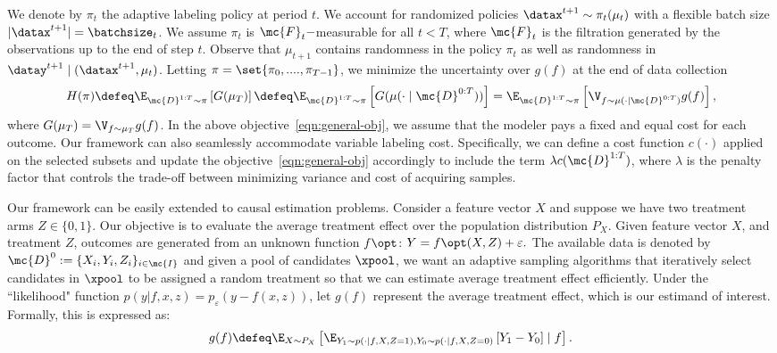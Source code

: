  We denote by $\pi_t$ the adaptive labeling policy at period $t$. We account for randomized policies $\datax^{t+1} \sim \pi_t(\mu_t)$ with a flexible batch size $|\datax^{t+1}| = \batchsize_t$.   
We assume $\pi_t$ is $\mc{F}_t-$measurable for all $t < T$, where $\mc{F}_t$ is the filtration generated by the observations up to the end of step $t$.
 Observe that $\mu_{t+1}$ contains randomness in the policy $\pi_t$ as well as randomness in $\datay^{t+1} \mid (\datax^{t+1},\mu_t)$. Letting $\pi = \set{\pi_0,....,\pi_{T-1}}$,  we minimize the uncertainty over $g(f)$
 at the end of data collection
\begin{align}
H(\pi) \defeq \E_{\mc{D}^{1:T} \sim \pi} \left[G(\mu_{T}) \right]  \defeq  \E_{\mc{D}^{1:T} \sim \pi} \left[G(\mu(\cdot \mid \mc{D}^{0:T})) \right]
     = \E_{\mc{D}^{1:T} \sim \pi} \left[ \V_{f \sim \mu(\cdot \mid \mc{D}^{0:T})}  g(f)  \right],
     \label{eqn:general-obj}
\end{align}   
where $G(\mu_T) = \V_{f \sim \mu_T}  g(f)$.
In the above objective~\eqref{eqn:general-obj}, we assume
that the modeler pays a fixed and equal cost for each outcome. 
Our framework can also seamlessly accommodate variable labeling cost. Specifically, we can define a cost function $c(\cdot)$ 
 applied on the selected subsets 
 and update the objective~\eqref{eqn:general-obj} accordingly to include the term  $\lambda c(\mc{D}^{1:T})$,
 where $\lambda$
 is the penalty factor that controls the trade-off between minimizing variance and cost of acquiring samples.


Our framework can be easily extended to causal estimation problems.  Consider a feature vector ${X}$ and suppose we have two treatment arms $Z \in \{0,1\}$. Our objective is to evaluate the average treatment effect over the population distribution $P_X$.  Given feature vector $X$, and treatment $Z$,  outcomes are generated from an unknown function $f\opt$: 
$Y = f\opt(X,Z) + \varepsilon.$
The available data is denoted by $\mc{D}^0 := \{X_i,Y_i,Z_i\}_{i \in \mc{I}}$ and given a pool of candidates 
$\xpool$, we want an
 adaptive sampling algorithms that iteratively select
candidates in $\xpool$ to be assigned a random treatment so that we can estimate average treatment effect efficiently. Under the ``likelihood" function $p(y | f, x, z) = p_{\varepsilon}(y - f(x,z))$,  let $g(f)$ represent  the average treatment effect, which is our estimand of interest. Formally, this is expressed as:
\begin{align}
g(f) \defeq \E_{X \sim P_X} \left[\E_{Y_1 \sim p(\cdot|f,X,Z=1) , Y_0 \sim p(\cdot|f,X,Z=0)} \left[Y_1 -  Y_0 \right]\mid f \right]. \label{eqn:ate-g-f}
\end{align}





